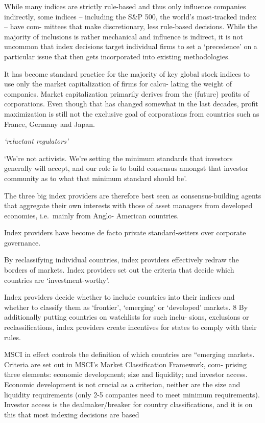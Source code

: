 \documentclass[
]{book}
\begin{document}
While many indices are strictly rule-based and thus only influence companies indirectly,
some indices -- including the S\&P 500, the world's most-tracked index -- have com-
mittees that make discretionary, less rule-based decisions.
While the majority of inclusions is rather mechanical
and influence is indirect, it is not uncommon that index decisions target individual
firms to set a `precedence' on a particular issue that then gets incorporated into
existing methodologies.

It has become standard practice for the majority
of key global stock indices to use only the market capitalization of firms for calcu-
lating the weight of companies. Market capitalization primarily derives from the
(future) profits of corporations. Even though that has changed somewhat in the
last decades, profit maximization is still not the exclusive goal of corporations from
countries such as France, Germany and Japan.

\emph{`reluctant regulators'}

`We're not activists. We're setting the minimum standards
that investors generally will accept, and our role is to build consensus amongst that
investor community as to what that minimum standard should be'.

The three big index providers are therefore best
seen as consensus-building agents that aggregate their own interests with those of
asset managers from developed economies, i.e.~mainly from Anglo-
American countries.

Index providers have become de facto private standard-setters over corporate governance.

By reclassifying individual countries, index providers effectively redraw the borders of
markets. Index providers set out the criteria that decide which countries are
`investment-worthy'.

Index providers decide whether to include countries
into their indices and whether to classify them as `frontier', `emerging' or
`developed' markets. 8 By additionally putting countries on watchlists for such inclu-
sions, exclusions or reclassifications, index providers create incentives for states to
comply with their rules.

MSCI in effect controls the definition of which countries
are ``emerging markets.
Criteria are set out in MSCI's Market Classification Framework, com-
prising three elements: economic development; size and liquidity; and investor
access. Economic development is not crucial as a criterion, neither are the size and
liquidity requirements (only 2-5 companies need to meet minimum requirements).
Investor access is the dealmaker/breaker for country classifications, and it is on this
that most indexing decisions are based
\end{document}
